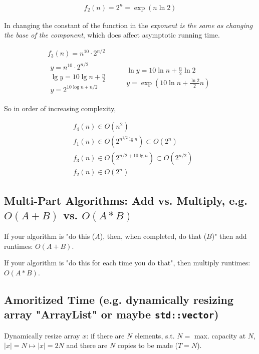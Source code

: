 \documentclass[10pt]{amsart}
\begin{document}
\begin{multicols*}{2}
\[
\begin{gathered}
	f_2(n) = 2^n = \exp{(n\ln{2})}
\end{gathered}
\]

In changing the constant of the function in the \emph{exponent is the same as changing the base of the component}, which does affect asymptotic running time.

\[
\begin{gathered}
f_3(n) = n^{10} \cdot 2^{n/2} \\
\begin{gathered}
y = n^{10} \cdot 2^{n/2} \\
\lg{y} = 10 \lg{n} + \frac{n}{2} \\
y = 2^{10 \log{n} + n/2}
\end{gathered}
\quad \quad \, \begin{gathered}
\ln{y} = 10 \ln{n} + \frac{n}{2} \ln{2} \\
y = \exp{(10 \ln{n} + \frac{ \ln{2}}{2} n )}
\end{gathered}
\end{gathered}
\]

So in order of increasing complexity,

\[
\boxed{
\begin{aligned}
& f_4(n) \in O(n^2) \\
& f_1(n) \in O(2^{n^{1/2} \lg{n}}) \subset O(2^n) \\
& f_3(n) \in O(2^{n/2 + 10 \lg{n}}) \subset O(2^{n/2}) \\
& f_2(n) \in O(2^n)
\end{aligned}
}
\]


\subsection{Multi-Part Algorithms: Add vs. Multiply, e.g. $O(A + B)$ vs. $O(A*B)$}

If your algorithm is "do this ($A$), then, when completed, do that ($B$)" then add runtimes: $O(A+B)$.

If your algorithm is "do this for each time you do that", then multiply runtimes: $O(A*B)$.

\subsection{Amoritized Time (e.g. dynamically resizing array "ArrayList" or maybe \texttt{std::vector})}

Dynamically resize array $x$: if there are $N$ elements, s.t. $N= $ max. capacity at $N$, $|x| = N \mapsto |x| = 2N$ and there are $N$ copies to be made ($T=N$). 


\end{multicols*}
\end{document}
